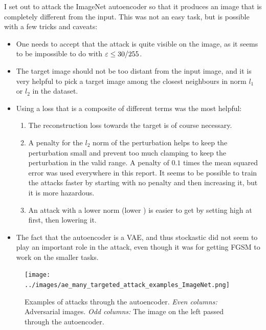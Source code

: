 \documentclass[]{scrarticle}
\begin{document}
I set out to attack the ImageNet autoencoder
so that it produces an image that is completely different from the input.
This was not an easy task, but is possible with a few tricks and caveats:
\begin{itemize}
  \item One needs to accept that the attack is quite visible on the image,
    as it seems to be impossible to do with $\varepsilon \leq 30 / 255$.
  \item The target image should not be too distant from the input image,
    and it is very helpful to pick a target image among the closest neighbours
    in norm $l_1$ or $l_2$ in the dataset.
  \item Using a loss that is a composite of different terms was the most helpful:
    \begin{enumerate}
      \item The reconstruction loss towards the target is of course necessary.
      \item A penalty for the $l_2$ norm of the perturbation helps to keep the
        perturbation small and prevent too much clamping to keep the perturbation
        in the valid range. A penalty of $0.1$ times the mean squared error was used
        everywhere in this report. It seems to be possible to train the attacks faster by
        starting with no penalty and then increasing it, but it is more hazardous.
      \item An attack with a lower norm (lower \e) is easier to get by setting \e high at first,
        then lowering it.
    \end{enumerate}
  \item The fact that the autoencoder is a VAE, and thus stockastic did not seem to
    play an important role in the attack, even though it was for getting FGSM to work on
    the smaller tasks.
\end{itemize}

\begin{figure}[h]
  \centering
  \texttt{[image: ../images/ae\_many\_targeted\_attack\_examples\_ImageNet.png]}
  \caption{
    Examples of attacks through the autoencoder.
    \emph{Even columns:} Adversarial images.
    \emph{Odd columns:} The image on the left passed through the autoencoder.
  }
  \label{fig:ae_targeted_attack_example2}
\end{figure}
\end{document}
